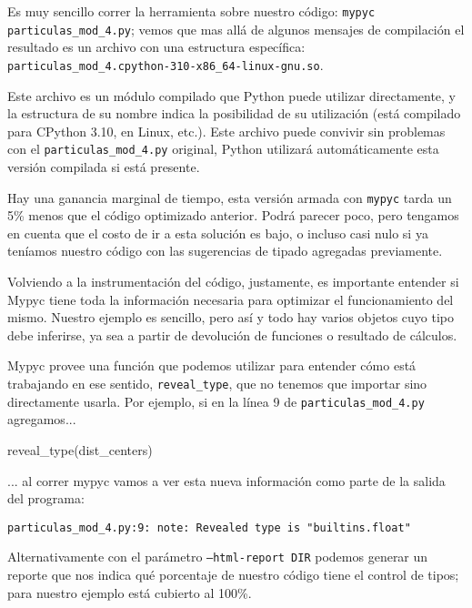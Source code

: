 Es muy sencillo correr la herramienta sobre nuestro código: \texttt{mypyc particulas\_mod\_4.py}; vemos que mas allá de algunos mensajes de compilación el resultado es un archivo con una estructura específica: \texttt{particulas\_mod\_4.cpython-310-x86\_64-linux-gnu.so}. 

Este archivo es un módulo compilado que Python puede utilizar directamente, y la estructura de su nombre indica la posibilidad de su utilización (está compilado para CPython 3.10, en Linux, etc.). Este archivo puede convivir sin problemas con el \texttt{particulas\_mod\_4.py} original, Python utilizará automáticamente esta versión compilada si está presente.


Hay una ganancia marginal de tiempo, esta versión armada con \texttt{mypyc} tarda un 5\% menos que el código optimizado anterior. Podrá parecer poco, pero tengamos en cuenta que el costo de ir a esta solución es bajo, o incluso casi nulo si ya teníamos nuestro código con las sugerencias de tipado agregadas previamente.

Volviendo a la instrumentación del código, justamente, es importante entender si Mypyc tiene toda la información necesaria para optimizar el funcionamiento del mismo. Nuestro ejemplo es sencillo, pero así y todo hay varios objetos cuyo tipo debe inferirse, ya sea a partir de devolución de funciones o resultado de cálculos. 

Mypyc provee una función que podemos utilizar para entender cómo está trabajando en ese sentido, \texttt{reveal\_type}, que no tenemos que importar sino directamente usarla. Por ejemplo, si en la línea 9 de \texttt{particulas\_mod\_4.py} agregamos...

\begin{py}
            reveal_type(dist_centers)
\end{py}

... al correr mypyc vamos a ver esta nueva información como parte de la salida del programa:

\begin{verbatim}
particulas_mod_4.py:9: note: Revealed type is "builtins.float"
\end{verbatim}

Alternativamente con el parámetro \texttt{--html-report DIR} podemos generar un reporte que nos indica qué porcentaje de nuestro código tiene el control de tipos; para nuestro ejemplo está cubierto al 100\%.
                
